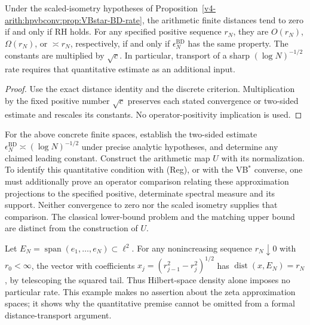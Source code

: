 \begin{theorem}
\label{v4-arith:hpvbconv:thm:finite-distance-transport}
Under the scaled-isometry hypotheses of
Proposition~\ref{v4-arith:hpvbconv:prop:VBstar-BD-rate}, the arithmetic
finite distances tend to zero if and only if RH holds. For any
specified positive sequence \(r_N\), they are \(O(r_N)\),
\(\Omega(r_N)\), or \(\asymp r_N\), respectively, if and only if
\(\epsilon_N^{\mathrm{BD}}\) has the same property. The constants
are multiplied by \(\sqrt c\).
In particular, transport of a sharp \((\log N)^{-1/2}\) rate requires
that quantitative estimate as an additional input.
\end{theorem}
\begin{proof}
Use the exact distance identity and the discrete criterion.
Multiplication by the fixed positive number \(\sqrt c\) preserves
each stated convergence or two-sided estimate and rescales its
constants. No operator-positivity implication is used.
\end{proof}

\begin{question}
\label{v4-arith:hpvbconv:question:BD-quantitative-comparison}
For the above concrete finite spaces, establish the two-sided
estimate \(\epsilon_N^{\mathrm{BD}}\asymp(\log N)^{-1/2}\) under
precise analytic hypotheses, and determine any claimed leading
constant. Construct the arithmetic map \(U\) with its normalization.
To identify this quantitative condition with (Reg), or with the
VB\(^{*}\) converse, one must additionally prove an operator
comparison relating these approximation projections to the
specified positive, determinate spectral measure and its support.
Neither convergence to zero nor the scaled isometry supplies that
comparison. The classical lower-bound problem and the matching
upper bound are distinct from the construction of \(U\).
\end{question}

\begin{remark}
Let \(E_N=\operatorname{span}(e_1,\ldots,e_N)\subset\ell^2\).
For any nonincreasing sequence \(r_N\downarrow0\) with \(r_0<\infty\),
the vector with coefficients
\(x_j=(r_{j-1}^2-r_j^2)^{1/2}\) has
\(\operatorname{dist}(x,E_N)=r_N\), by telescoping the squared tail.
Thus Hilbert-space density alone imposes no particular rate.
This example makes no assertion about the zeta approximation spaces;
it shows why the quantitative premise cannot be omitted from a
formal distance-transport argument.
\end{remark}

